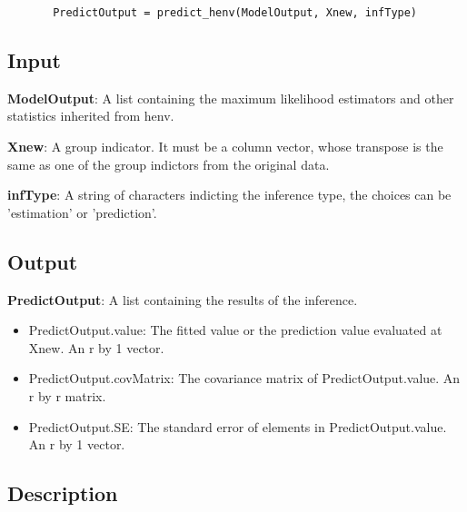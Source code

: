 \documentclass[a4paper,11pt,openany]{memoir}
\begin{document}
\begin{verbatim}       PredictOutput = predict_henv(ModelOutput, Xnew, infType)\end{verbatim}
    

\subsection*{Input}

\begin{par}
\textbf{ModelOutput}: A list containing the maximum likelihood estimators and other statistics inherited from henv.
\end{par} \vspace{1em}
\begin{par}
\textbf{Xnew}: A group indicator.  It must be a column vector, whose transpose is the same as one of the group indictors from the original data.
\end{par} \vspace{1em}
\begin{par}
\textbf{infType}: A string of characters indicting the inference type, the choices can be 'estimation' or 'prediction'.
\end{par} \vspace{1em}


\subsection*{Output}

\begin{par}
\textbf{PredictOutput}: A list containing the results of the inference.
\end{par} \vspace{1em}
\begin{itemize}
\setlength{\itemsep}{-1ex}
   \item PredictOutput.value: The fitted value or the prediction value evaluated at Xnew. An r by 1 vector.
   \item PredictOutput.covMatrix: The covariance matrix of PredictOutput.value. An r by r matrix.
   \item PredictOutput.SE: The standard error of elements in PredictOutput.value. An r by 1 vector.
\end{itemize}


\subsection*{Description}
\end{document}
